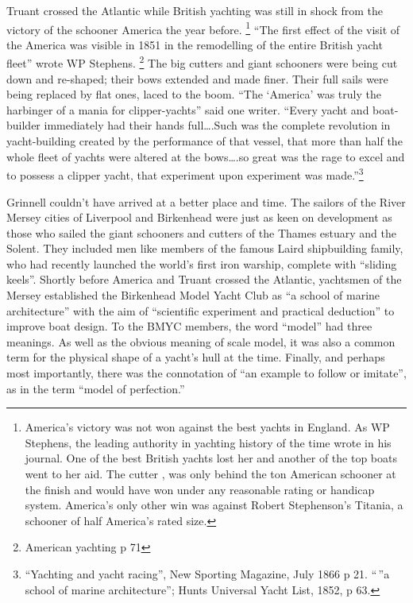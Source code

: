 \documentclass[
  letterpaper,
]{scrbook}
\begin{document}
Truant crossed the Atlantic while British yachting was still in shock
from the victory of the schooner America the year before. \footnote{America's
  victory was not won against the best yachts in England. As WP
  Stephens, the leading authority in yachting history of the time wrote
  in his journal. One of the best British yachts lost her and another of
  the top boats went to her aid. The cutter , was only behind the ton
  American schooner at the finish and would have won under any
  reasonable rating or handicap system. America's only other win was
  against Robert Stephenson's Titania, a schooner of half America's
  rated size.} ``The first effect of the visit of the America was
visible in 1851 in the remodelling of the entire British yacht fleet''
wrote WP Stephens. \footnote{American yachting p 71} The big cutters and
giant schooners were being cut down and re-shaped; their bows extended
and made finer. Their full sails were being replaced by flat ones, laced
to the boom. ``The `America' was truly the harbinger of a mania for
clipper-yachts'' said one writer. ``Every yacht and boat-builder
immediately had their hands full\ldots.Such was the complete revolution
in yacht-building created by the performance of that vessel, that more
than half the whole fleet of yachts were altered at the bows\ldots.so
great was the rage to excel and to possess a clipper yacht, that
experiment upon experiment was made.''\footnote{``Yachting and yacht
  racing'', New Sporting Magazine, July 1866 p 21. ``\,''a school of
  marine architecture''; Hunts Universal Yacht List, 1852, p 63.}

Grinnell couldn't have arrived at a better place and time. The sailors
of the River Mersey cities of Liverpool and Birkenhead were just as keen
on development as those who sailed the giant schooners and cutters of
the Thames estuary and the Solent. They included men like members of the
famous Laird shipbuilding family, who had recently launched the world's
first iron warship, complete with ``sliding keels''. Shortly before
America and Truant crossed the Atlantic, yachtsmen of the Mersey
established the Birkenhead Model Yacht Club as ``a school of marine
architecture'' with the aim of ``scientific experiment and practical
deduction'' to improve boat design. To the BMYC members, the word
``model'' had three meanings. As well as the obvious meaning of scale
model, it was also a common term for the physical shape of a yacht's
hull at the time. Finally, and perhaps most importantly, there was the
connotation of ``an example to follow or imitate'', as in the term
``model of perfection.''
\end{document}
